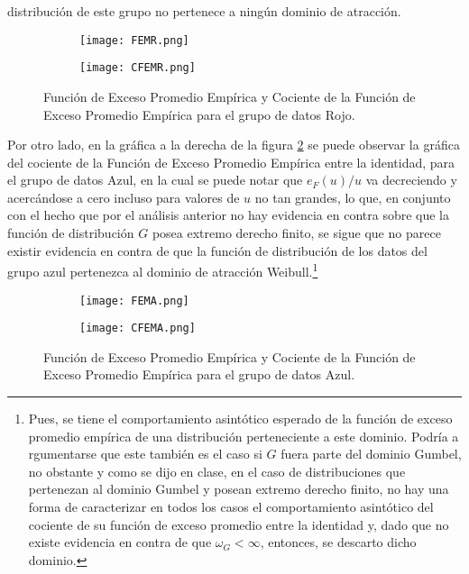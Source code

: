 \documentclass[10.5pt,notitlepage]{article}
\theoremstyle{plain}
\begin{document}
distribución de este grupo no pertenece a ningún dominio de atracción.
\begin{figure}[!tbp]
  \begin{subfigure}[b]{0.44\textwidth}
    \texttt{[image: FEMR.png]}
  \end{subfigure}
  \hfill
  \begin{subfigure}[b]{0.44\textwidth}
    \texttt{[image: CFEMR.png]}
  \end{subfigure}
  \caption{Función de Exceso Promedio Empírica y Cociente de la Función de Exceso Promedio Empírica para el grupo de datos Rojo.}
\label{1.3}
\end{figure}
Por otro lado, en la gráfica a la derecha de la figura \ref{1.4} se puede observar la gráfica del cociente de la Función de Exceso Promedio Empírica entre la identidad, para el grupo de datos Azul, en la cual se puede notar que $e_F(u)/u$ va decreciendo y acercándose a cero incluso para valores de $u$ no tan grandes, lo que, en conjunto con el hecho que por el análisis anterior no hay evidencia en contra sobre que la función de distribución \(G\) posea extremo derecho finito, se sigue que no parece existir evidencia en contra de que la función de distribución de los datos del grupo azul pertenezca al dominio de atracción Weibull.\footnote{Pues, se tiene el comportamiento asintótico esperado de la función de exceso promedio empírica de una distribución perteneciente a este dominio. Podría a rgumentarse que este también es el caso si \(G\) fuera parte del dominio Gumbel, no obstante y como se dijo en clase, en el caso de distribuciones que pertenezan al dominio Gumbel y posean extremo derecho finito, no hay una forma de caracterizar en todos los casos el comportamiento asintótico del cociente de su función de exceso promedio entre la identidad y, dado que no existe evidencia en contra de que \(\omega_{G} < \infty\), entonces, se descarto dicho dominio.}
\begin{figure}[!tbp]
  \begin{subfigure}[b]{0.44\textwidth}
    \texttt{[image: FEMA.png]}
  \end{subfigure}
  \hfill
  \begin{subfigure}[b]{0.44\textwidth}
    \texttt{[image: CFEMA.png]}
  \end{subfigure}
  \caption{Función de Exceso Promedio Empírica y Cociente de la Función de Exceso Promedio Empírica para el grupo de datos Azul.}
\label{1.4}
\end{figure}
\end{document}
